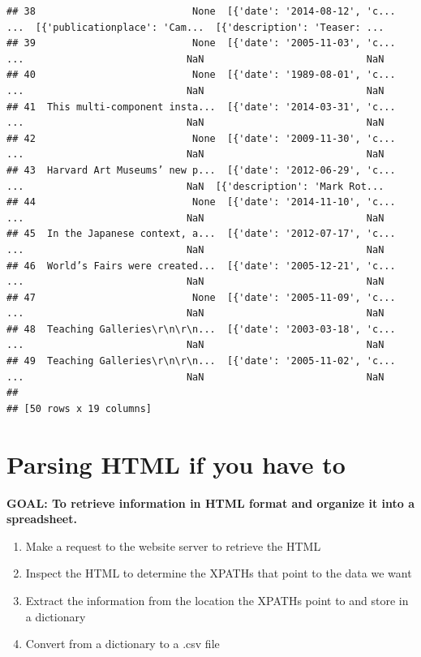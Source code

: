 \documentclass[
]{book}
\providecommand{\tightlist}{%
  \setlength{\itemsep}{0pt}\setlength{\parskip}{0pt}}
\begin{document}
\begin{verbatim}
## 38                           None  [{'date': '2014-08-12', 'c...  ...  [{'publicationplace': 'Cam...  [{'description': 'Teaser: ...
## 39                           None  [{'date': '2005-11-03', 'c...  ...                            NaN                            NaN
## 40                           None  [{'date': '1989-08-01', 'c...  ...                            NaN                            NaN
## 41  This multi-component insta...  [{'date': '2014-03-31', 'c...  ...                            NaN                            NaN
## 42                           None  [{'date': '2009-11-30', 'c...  ...                            NaN                            NaN
## 43  Harvard Art Museums’ new p...  [{'date': '2012-06-29', 'c...  ...                            NaN  [{'description': 'Mark Rot...
## 44                           None  [{'date': '2014-11-10', 'c...  ...                            NaN                            NaN
## 45  In the Japanese context, a...  [{'date': '2012-07-17', 'c...  ...                            NaN                            NaN
## 46  World’s Fairs were created...  [{'date': '2005-12-21', 'c...  ...                            NaN                            NaN
## 47                           None  [{'date': '2005-11-09', 'c...  ...                            NaN                            NaN
## 48  Teaching Galleries\r\n\r\n...  [{'date': '2003-03-18', 'c...  ...                            NaN                            NaN
## 49  Teaching Galleries\r\n\r\n...  [{'date': '2005-11-02', 'c...  ...                            NaN                            NaN
## 
## [50 rows x 19 columns]
\end{verbatim}

\hypertarget{parsing-html-if-you-have-to}{%
\section{Parsing HTML if you have to}\label{parsing-html-if-you-have-to}}

\textbf{GOAL: To retrieve information in HTML format and organize it into a spreadsheet.}

\begin{enumerate}
\def\labelenumi{\arabic{enumi}.}
\tightlist
\item
  Make a request to the website server to retrieve the HTML
\item
  Inspect the HTML to determine the XPATHs that point to the data we want
\item
  Extract the information from the location the XPATHs point to and store in a dictionary
\item
  Convert from a dictionary to a .csv file
\end{enumerate}
\end{document}
